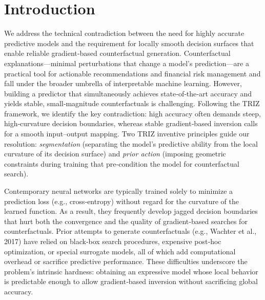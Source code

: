 \documentclass[11pt,a4paper]{article}
\begin{document}
\section{Introduction}
\label{sec:intro}
We address the technical contradiction between the need for highly accurate predictive models and the requirement for locally smooth decision surfaces that enable reliable gradient‑based counterfactual generation.
Counterfactual explanations---minimal perturbations that change a model’s prediction---are a practical tool for actionable recommendations and financial risk management and fall under the broader umbrella of interpretable machine learning.
However, building a predictor that simultaneously achieves state‑of‑the‑art accuracy and yields stable, small‑magnitude counterfactuals is challenging.
Following the TRIZ framework, we identify the key contradiction: high accuracy often demands steep, high‑curvature decision boundaries, whereas stable gradient‑based inversion calls for a smooth input–output mapping.
Two TRIZ inventive principles guide our resolution: \emph{segmentation} (separating the model’s predictive ability from the local curvature of its decision surface) and \emph{prior action} (imposing geometric constraints during training that pre‑condition the model for counterfactual search).

Contemporary neural networks are typically trained solely to minimize a prediction loss (e.g., cross‑entropy) without regard for the curvature of the learned function.
As a result, they frequently develop jagged decision boundaries that hurt both the convergence and the quality of gradient‑based searches for counterfactuals.
Prior attempts to generate counterfactuals (e.g., Wachter et al., 2017) have relied on black‑box search procedures, expensive post‑hoc optimization, or special surrogate models, all of which add computational overhead or sacrifice predictive performance.
These difficulties underscore the problem’s intrinsic hardness: obtaining an expressive model whose local behavior is predictable enough to allow gradient‑based inversion without sacrificing global accuracy.
\end{document}
